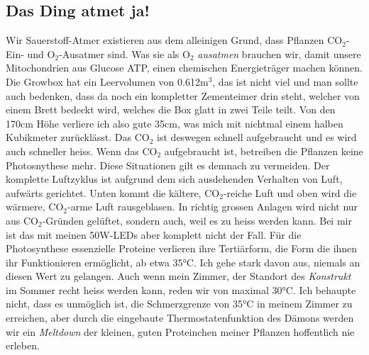 \documentclass[12pt,titlepage,a4paper]{article}
\begin{document}
\subsection{Das Ding atmet ja!}
Wir Sauerstoff-Atmer existieren aus dem alleinigen Grund, dass Pflanzen CO$ _{2} $-Ein- und O$ _{2} $-Ausatmer sind. Was sie als O$ _{2} $ \textit{ausatmen} brauchen wir, damit unsere Mitochondrien aus Glucose ATP, einen chemischen Energieträger machen können.
Die Growbox hat ein Leervolumen von 0.612m$ ^{3} $, das ist nicht viel und man sollte auch bedenken, dass da noch ein kompletter Zementeimer drin steht, welcher von einem Brett bedeckt wird, welches die Box glatt in zwei Teile teilt. Von den 170cm Höhe verliere ich also gute 35cm, was mich mit nichtmal einem halben Kubikmeter zurücklässt. Das CO$ _{2} $ ist deswegen schnell aufgebraucht und es wird auch schneller heiss. Wenn das CO$ _{2} $ aufgebraucht ist, betreiben die Pflanzen keine Photosnythese mehr. Diese Situationen gilt es demnach zu vermeiden. Der komplette Luftzyklus ist aufgrund dem sich ausdehenden Verhalten von Luft, aufwärts gerichtet. Unten kommt die kältere, CO$ _{2} $-reiche Luft und oben wird die wärmere, CO$ _{2} $-arme Luft rausgeblasen. In richtig grossen Anlagen wird nicht nur aus CO$ _{2} $-Gründen gelüftet, sondern auch, weil es zu heiss werden kann. Bei mir ist das mit meinen 50W-LEDs aber komplett nicht der Fall. Für die Photosynthese essenzielle Proteine verlieren ihre Tertiärform, die Form die ihnen ihr Funktionieren ermöglicht, ab etwa 35°C. Ich gehe stark davon aus, niemals an diesen Wert zu gelangen. Auch wenn mein Zimmer, der Standort des \textit{Konstrukt} im Sommer recht heiss werden kann, reden wir von maximal 30°C. Ich behaupte nicht, dass es unmöglich ist, die Schmerzgrenze von 35°C in meinem Zimmer zu erreichen, aber durch die eingebaute Thermostatenfunktion des Dämons werden wir ein \textit{Meltdown} der kleinen, guten Proteinchen meiner Pflanzen hoffentlich nie erleben.
\end{document}
